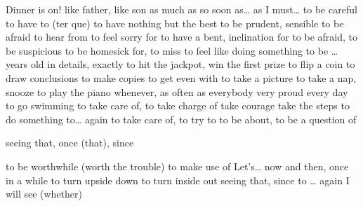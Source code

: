 {Dinner is on!}
{like father, like son}
{as much as}
{so soon}
{as… as}
{I must…}
{to be careful}
{to have to (ter que)}
{to have nothing but the best}
{to be prudent, sensible}
{to be afraid}
{to hear from}
{to feel sorry for}
{to have a bent, inclination for}
{to be afraid, to be suspicious}
{to be homesick for, to miss}
{to feel like doing something}
{to be … years old}
{in details, exactly}
{to hit the jackpot, win the first prize}
{to flip a coin}
{to draw conclusions}
{to make copies}
{to get even with}
{to take a picture}
{to take a nap, snooze}
{to play the piano}
{whenever, as often as}
{everybody}
{very proud}
{every day}
{to go swimming}
{to take care of, to take charge of}
{take courage}
{take the steps to do something}
{to… again}
{to take care of, to try to}
{to be about, to be a question of}

{seeing that, once (that), since}

{to be worthwhile (worth the trouble)}
{to make use of}
{Let’s…}
{now and then, once in a while}
{to turn upside down}
{to turn inside out}
{seeing that, since}
{to … again}
{I will see (whether)}
